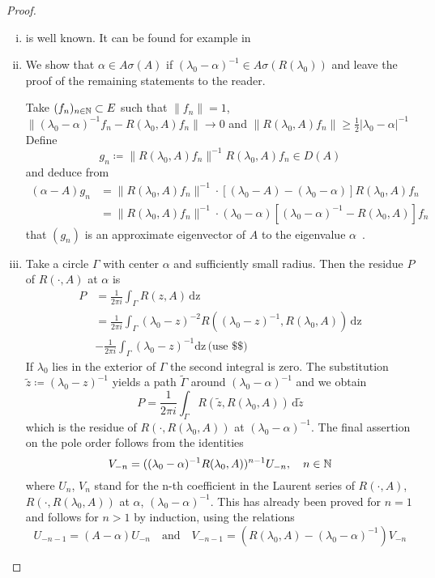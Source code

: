 \begin{proof}
\begin{enumerate}[(i), wide]
\item 
is well known. It can be found for example in \citet[VII.9.2]{dunfordschwartz:1958}

\item 
We show that $\alpha \in A\sigma(A)$ if $(\lambda_{0}-\alpha)^{-1} \in A\sigma(R(\lambda_{0}))$ and leave the proof of the remaining statements to the reader.

Take $(f_{n})_{n \in \mathbb{N}} \subset E$ such that $\|f_{n}\| = 1$, $\|(\lambda_{0}-\alpha)^{-1}f_{n} - R(\lambda_{0},A)f_{n}\| \to 0$ and $\|R(\lambda_{0},A)f_{n}\| \geq \frac{1}{2}|\lambda_{0} - \alpha|^{-1}$
Define
\[
g_{n} \coloneqq \|R(\lambda_{0},A)f_{n}\|^{-1}R(\lambda_{0},A)f_{n} \in D(A)
\]
and deduce from
\begin{align*}
(\alpha-A)g_{n} &= \|R(\lambda_{0},A)f_{n}\|^{-1} \cdot 
		[(\lambda_{0}-A) - (\lambda_{0}-\alpha)]R(\lambda_{0},A)f_{n} \\  
	&= \|R(\lambda_{0},A)f_{n}\|^{-1} \cdot 			(\lambda_{0}-\alpha)[(\lambda_{0}-\alpha)^{-1} - R(\lambda_{0},A)]f_{n}
\end{align*}
that $(g_{n})$ is an approximate eigenvector of $A$ to the eigenvalue $\alpha$~.

\item 
Take a circle $\Gamma$ with center $\alpha$ and sufficiently small radius. 
Then the residue $P$ of $R(\cdot,A)$ at $\alpha$ is
\begin{align*}
P &= \frac{1}{2\pi i} \int_{\Gamma} R(z,A) \, \mathrm{dz} \\
&= \frac{1}{2\pi i} \int_{\Gamma} (\lambda_{0}-z)^{-2}R((\lambda_{0}-z)^{-1},R(\lambda_{0},A)) \, \mathrm{dz} \\
&- \frac{1}{2\pi i} \int_{\Gamma}(\lambda_{0}-z)^{-1} \mathrm{dz} \, \text{(use \$\$)}
\end{align*}
If $\lambda_{0}$ lies in the exterior of $\Gamma$ the second integral is zero.
The substitution $\tilde{z} \coloneqq (\lambda_{0} - z)^{-1}$ yields a path $\tilde{\Gamma}$ around $(\lambda_{0}-\alpha)^{-1}$ and we obtain
\[
P = \frac{1}{2\pi i} \int_{\Gamma} R(\tilde{z},R(\lambda_{0},A)) \, \mathrm{d}\tilde{z}
\]
which is the residue of $R(\cdot,R(\lambda_{0},A))$ at $(\lambda_{0}-\alpha)^{-1}$.
The final assertion on the pole order follows from the identities
\[
V_{-n} = ((\lambda_{0}-\alpha)^{-1}R(\lambda_{0},A))^{n-1}U_{-n}, \quad n \in \mathbb{N}
\]
where $U_{n}$, \resp $V_{n}$ stand for the n-th coefficient in the Laurent series of $R(\cdot,A)$, \resp $R(\cdot,R(\lambda_{0},A))$ at $\alpha$, \resp $(\lambda_{0}-\alpha)^{-1}$.
This has already been proved for $n = 1$ and follows for $n > 1$ by induction, using the relations
\[
U_{-n-1} = (A - \alpha)U_{-n} \quad \text{and} \quad V_{-n-1} = (R(\lambda_{0},A) - (\lambda_{0}-\alpha)^{-1})V_{-n}
\]
\end{enumerate}
\end{proof}
